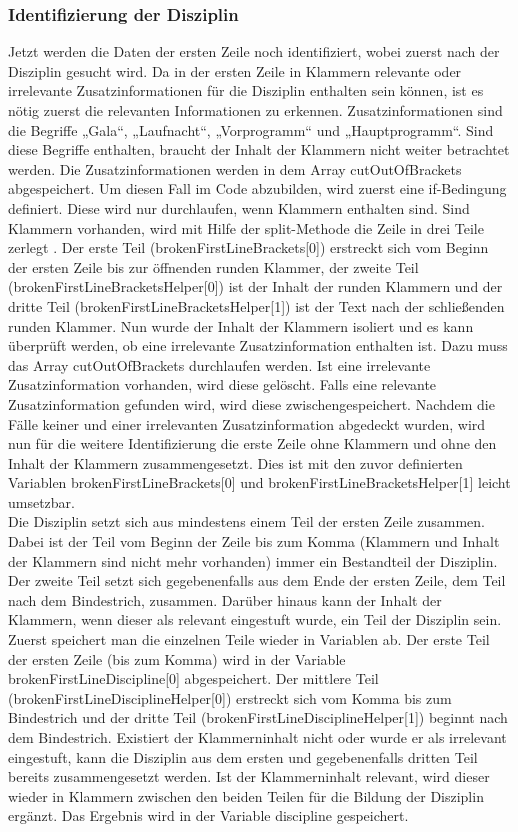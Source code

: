 \subsubsection{Identifizierung der Disziplin}
Jetzt werden die Daten der ersten Zeile noch identifiziert, wobei zuerst nach der Disziplin gesucht wird.
Da in der ersten Zeile in Klammern relevante oder irrelevante Zusatzinformationen für die Disziplin enthalten sein können, ist es nötig zuerst die relevanten Informationen zu erkennen. Zusatzinformationen sind die Begriffe „Gala“, „Laufnacht“, „Vorprogramm“ und „Hauptprogramm“. Sind diese Begriffe enthalten, braucht der Inhalt der Klammern nicht weiter betrachtet werden. Die Zusatzinformationen werden in dem Array cutOutOfBrackets abgespeichert. Um diesen Fall im Code abzubilden, wird zuerst eine if-Bedingung definiert. Diese wird nur durchlaufen, wenn Klammern enthalten sind. Sind Klammern vorhanden, wird mit Hilfe der split-Methode die Zeile in drei Teile zerlegt \cite{split}. Der erste Teil (brokenFirstLineBrackets[0]) erstreckt sich vom Beginn der ersten Zeile bis zur öffnenden runden Klammer, der zweite Teil (brokenFirstLineBracketsHelper[0]) ist der Inhalt der runden Klammern und der dritte Teil (brokenFirstLineBracketsHelper[1]) ist der Text nach der schließenden runden Klammer. Nun wurde der Inhalt der Klammern isoliert und es kann überprüft werden, ob eine irrelevante Zusatzinformation enthalten ist. Dazu muss das Array cutOutOfBrackets durchlaufen werden. Ist eine irrelevante Zusatzinformation vorhanden, wird diese gelöscht. Falls eine relevante Zusatzinformation gefunden wird, wird diese zwischengespeichert. Nachdem die Fälle keiner und einer irrelevanten Zusatzinformation abgedeckt wurden, wird nun für die weitere Identifizierung die erste Zeile ohne Klammern und ohne den Inhalt der Klammern zusammengesetzt. Dies ist mit den zuvor definierten Variablen brokenFirstLineBrackets[0] und brokenFirstLineBracketsHelper[1] leicht umsetzbar.\\
Die Disziplin setzt sich aus mindestens einem Teil der ersten Zeile zusammen. Dabei ist der Teil vom Beginn der Zeile bis zum Komma (Klammern und Inhalt der Klammern sind nicht mehr vorhanden) immer ein Bestandteil der Disziplin. Der zweite Teil setzt sich gegebenenfalls aus dem Ende der ersten Zeile, dem Teil nach dem Bindestrich, zusammen. Darüber hinaus kann der Inhalt der Klammern, wenn dieser als relevant eingestuft wurde, ein Teil der Disziplin sein.
Zuerst speichert man die einzelnen Teile wieder in Variablen ab. Der erste Teil der ersten Zeile (bis zum Komma) wird in der Variable brokenFirstLineDiscipline[0] abgespeichert. Der mittlere Teil (brokenFirstLineDisciplineHelper[0]) erstreckt sich vom Komma bis zum Bindestrich und der dritte Teil (brokenFirstLineDisciplineHelper[1]) beginnt nach dem Bindestrich. Existiert der Klammerninhalt nicht oder wurde er als irrelevant eingestuft, kann die Disziplin aus dem ersten und gegebenenfalls dritten Teil bereits zusammengesetzt werden. Ist der Klammerninhalt relevant, wird dieser wieder in Klammern zwischen den beiden Teilen für die Bildung der Disziplin ergänzt. Das Ergebnis wird in der Variable discipline gespeichert.\\
